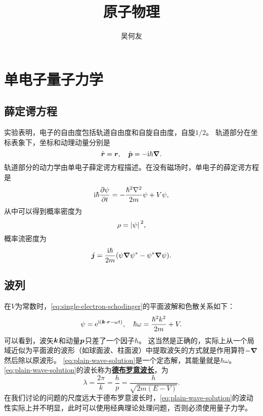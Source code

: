 \documentclass[UTF8, a4paper]{ctexart}
\title{原子物理}
\author{吴何友}
\newcommand*{\ee}{\mathrm{e}}
\newcommand*{\ii}{\mathrm{i}}
\newcommand*{\concept}[1]{\underline{\textbf{#1}}}
\begin{document}
\maketitle

\section{单电子量子力学}

\subsection{薛定谔方程}

实验表明，电子的自由度包括轨道自由度和自旋自由度，自旋$1/2$。
轨道部分在坐标表象下，坐标和动理动量分别是
\begin{equation}
    \hat{\vb*{r}} = \vb*{r}, \quad \hat{\vb*{p}} = -\ii \hbar \grad.
    \label{eq:single-electron-schodinger}
\end{equation}
轨道部分的动力学由单电子薛定谔方程描述。在没有磁场时，单电子的薛定谔方程是
\begin{equation}
    \ii \hbar \pdv{\psi}{t} = - \frac{\hbar^2 \laplacian}{2m} \psi + V \psi,
\end{equation}
从中可以得到概率密度为
\begin{equation}
    \rho = \abs*{\psi}^2,
\end{equation}
概率流密度为
\begin{equation}
    \vb*{j} = \frac{\ii \hbar}{2m} (\psi \grad{\psi^*} - \psi^* \grad{\psi}).
\end{equation}

\subsection{波列}

在$V$为常数时，\eqref{eq:single-electron-schodinger}的平面波解和色散关系如下：
\begin{equation}
    \psi = \ee^{\ii(\vb*{k} \cdot \vb*{r} - \omega t)}, \quad \hbar \omega = \frac{\hbar^2 k^2}{2m} + V.
    \label{eq:plain-wave-solution}
\end{equation}
可以看到，波矢$\vb*{k}$和动量$\vb*{p}$只差了一个因子$\hbar$。
这当然是正确的，实际上从一个局域近似为平面波的波形（如球面波、柱面波）中提取波矢的方式就是作用算符$-\grad$然后除以原波形。
\eqref{eq:plain-wave-solution}是一个定态解，其能量就是$\hbar \omega$。
\eqref{eq:plain-wave-solution}的波长称为\concept{德布罗意波长}，为
\begin{equation}
    \lambda = \frac{2\pi}{k} = \frac{h}{p} = \frac{h}{\sqrt{2m(E-V)}}.
\end{equation}
在我们讨论的问题的尺度远大于德布罗意波长时，\eqref{eq:plain-wave-solution}的波动性实际上并不明显，此时可以使用经典理论处理问题，否则必须使用量子力学。
\end{document}

